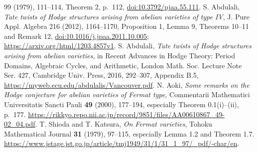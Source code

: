 \documentclass[11pt]{article}
\theoremstyle{definition}
\begin{document}
\begin{thebibliography}{99}
(1979), 111--114, Theorem 2, p.\ 112,
\href{https://doi.org/10.3792/pjaa.55.111}{doi:10.3792/pjaa.55.111}.
 S. Abdulali, \emph{Tate twists of Hodge structures
arising from abelian varieties of type IV}, J. Pure Appl. Algebra 216
(2012), 1164--1170, Proposition 1, Lemma 9, Theorems 10--11 and Remark 12,
\href{https://doi.org/10.1016/j.jpaa.2011.10.005}{doi:10.1016/j.jpaa.2011.10.005};
\url{https://arxiv.org/html/1203.4857v1}.
 S. Abdulali, \emph{Tate twists of Hodge structures
arising from abelian varieties}, in Recent Advances in Hodge Theory:
Period Domains, Algebraic Cycles, and Arithmetic, London Math. Soc.
Lecture Note Ser. 427, Cambridge Univ. Press, 2016, 292--307,
Appendix B.5, \url{https://myweb.ecu.edu/abdulalis/Vancouver.pdf}.
 N. Aoki, \emph{Some remarks on the Hodge conjecture for
abelian varieties of Fermat type}, Commentarii Mathematici Universitatis
Sancti Pauli \textbf{49} (2000), 177--194, especially Theorem 0.1(i)--(ii),
p.~177. \url{https://rikkyo.repo.nii.ac.jp/record/9851/files/AA00610867_49-02_04.pdf}.
 T. Shioda and T. Katsura, \emph{On Fermat varieties},
Tohoku Mathematical Journal \textbf{31} (1979), 97--115, especially
Lemma 1.2 and Theorem 1.7.
\url{https://www.jstage.jst.go.jp/article/tmj1949/31/1/31_1_97/_pdf/-char/en}.
\end{thebibliography}
\end{document}
